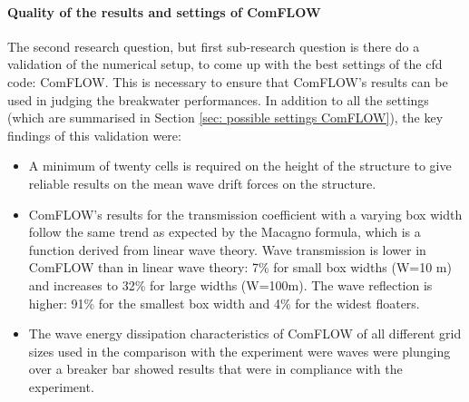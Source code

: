 \paragraph{Quality of the results and settings of ComFLOW } The second research question, but first sub-research question is there do a validation of the numerical setup, to come up with the best settings of the \acrfull{cfd} code: ComFLOW. This is necessary to ensure that ComFLOW's results can be used in judging the breakwater performances. In addition to all the settings (which are summarised in Section \ref{sec: possible settings ComFLOW}), the key findings of this validation were:
\begin{itemize}
    \item A minimum of twenty cells is required on the height of the structure to give reliable results on the mean wave drift forces on the structure.
    \item ComFLOW's results for the transmission coefficient with a varying box width follow the same trend as expected by the Macagno formula, which is a function derived from linear wave theory. Wave transmission is lower in ComFLOW than in linear wave theory: 7\% for small box widths (W=10 m) and increases to 32\% for large widths (W=100m). The wave reflection is higher: 91\% for the smallest box width and 4\% for the widest floaters. 
    \item The wave energy dissipation characteristics of ComFLOW of all different grid sizes used in the comparison with the experiment were waves were plunging over a breaker bar showed results that were in compliance with the experiment.
\end{itemize}


